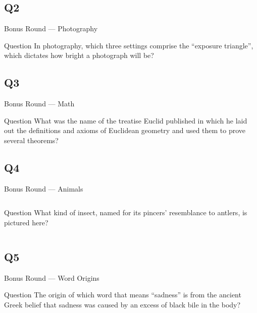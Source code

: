 \documentclass[11pt]{beamer}
\begin{document}
\subsection*{Q2}
\begin{frame}[t]{Bonus Round --- Photography}
\vspace{-0.5em}
\begin{block}{Question}
In photography, which three settings comprise the ``exposure triangle'', which dictates how bright a photograph will be?
\end{block}
\end{frame}
\subsection*{Q3}
\begin{frame}[t]{Bonus Round --- Math}
\vspace{-0.5em}
\begin{block}{Question}
What was the name of the treatise Euclid published in which he laid out the definitions and axioms of Euclidean geometry and used them to prove several theorems?
\end{block}
\end{frame}
\subsection*{Q4}
\begin{frame}[t]{Bonus Round --- Animals}
\vspace{-0.5em}
\begin{columns}[T,totalwidth=\linewidth]
\begin{column}{0.32\linewidth}
\begin{block}{Question}
What kind of insect, named for its pincers' resemblance to antlers, is pictured here?
\end{block}
\end{column}
\begin{column}{0.65\linewidth}
\begin{center}
\texttt{[image: \{Images/stagbeetle]}.jpg}
\end{center}
\end{column}
\end{columns}
\end{frame}
\subsection*{Q5}
\begin{frame}[t]{Bonus Round --- Word Origins}
\vspace{-0.5em}
\begin{block}{Question}
The origin of which word that means ``sadness'' is from the ancient Greek belief that sadness was caused by an excess of black bile in the body?
\end{block}
\end{frame}
\end{document}
